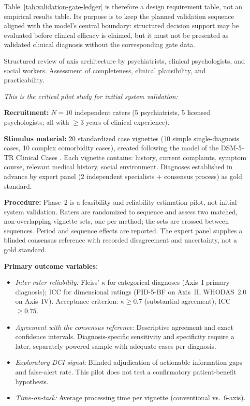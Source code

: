 \documentclass[11pt,a4paper]{article}
\begin{document}
Table~\ref{tab:validation-gate-ledger} is therefore a design requirement table, not an empirical results table. Its purpose is to keep the planned validation sequence aligned with the model's central boundary: structured decision support may be evaluated before clinical efficacy is claimed, but it must not be presented as validated clinical diagnosis without the corresponding gate data.

\begin{description}[style=nextline, leftmargin=1.5cm, font=\bfseries]
\item[Phase~1: Expert Review (N=10--15)] Structured review of axis architecture by psychiatrists, clinical psychologists, and social workers. Assessment of completeness, clinical plausibility, and practicability.

\item[Phase~2: Inter-Rater Reliability Study with Case Vignettes (N=10 raters, 20 vignettes)] \textit{This is the critical pilot study for initial system validation:}

\textbf{Recruitment:} $N = 10$ independent raters (5 psychiatrists, 5 licensed psychologists; all with $\geq 3$ years of clinical experience).

\textbf{Stimulus material:} 20 standardized case vignettes (10 simple single-diagnosis cases, 10 complex comorbidity cases), created following the model of the DSM-5-TR Clinical Cases \citep{BarnhillDSM5ClinicalCases}. Each vignette contains: history, current complaints, symptom course, relevant medical history, social environment. Diagnoses established in advance by expert panel (2 independent specialists + consensus process) as gold standard.

\textbf{Procedure:} Phase~2 is a feasibility and reliability-estimation pilot, not initial system validation. Raters are randomized to sequence and assess two matched, non-overlapping vignette sets, one per method; the sets are crossed between sequences. Period and sequence effects are reported. The expert panel supplies a blinded consensus reference with recorded disagreement and uncertainty, not a gold standard.

\textbf{Primary outcome variables:}
\begin{itemize}[leftmargin=*, noitemsep]
    \item \textit{Inter-rater reliability:} Fleiss' $\kappa$ for categorical diagnoses (Axis~I primary diagnosis); ICC for dimensional ratings (PID-5-BF on Axis~II, WHODAS~2.0 on Axis~IV). Acceptance criterion: $\kappa \geq 0.7$ (substantial agreement); ICC $\geq 0.75$.
    \item \textit{Agreement with the consensus reference:} Descriptive agreement and exact confidence intervals. Diagnosis-specific sensitivity and specificity require a later, separately powered sample with adequate cases per diagnosis.
    \item \textit{Exploratory DCI signal:} Blinded adjudication of actionable information gaps and false-alert rate. This pilot does not test a confirmatory patient-benefit hypothesis.
    \item \textit{Time-on-task:} Average processing time per vignette (conventional vs.\ 6-axis).
\end{itemize}


\end{description}
\end{document}
